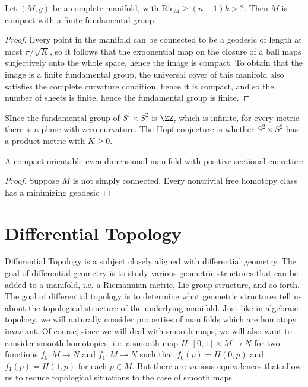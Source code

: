 \begin{corollary}
    Let $(M,g)$ be a complete manifold, with $\text{Ric}_M \geq (n-1)k > ?$. Then $M$ is compact with a finite fundamental group.
\end{corollary}
\begin{proof}
    Every point in the manifold can be connected to be a geodesic of length at most $\pi/\sqrt{K}$, so it follows that the exponential map on the closure of a ball maps surjectively onto the whole space, hence the image is compact. To obtain that the image is a finite fundamental group, the universal cover of this manifold also satisfies the complete curvature condition, hence it is compact, and so the number of sheets is finite, hence the fundamental group is finite.
\end{proof}

\begin{example}
    SInce the fundamental group of $S^1 \times S^2$ is $\ZZ$, which is infinite, for every metric there is a plane with zero curvature. The Hopf conjecture is whether $S^2 \times S^2$ has a product metric with $K \geq 0$.
\end{example}

\begin{theorem}[Synge]
    A compact orientable even dimensional manifold with positive sectional curvature
\end{theorem}
\begin{proof}
    Suppose $M$ is not simply connected. Every nontrivial free homotopy class has a minimizing geodesic
\end{proof}










\part{Differential Topology}

Differential Topology is a subject closely aligned with differential geometry. The goal of differential geometry is to study various geometric structures that can be added to a manifold, i.e. a Riemannian metric, Lie group structure, and so forth. The goal of differential topology is to determine what geometric structures tell us about the topological structure of the underlying manifold. Just like in algebraic topology, we will naturally consider properties of manifolds which are homotopy invariant. Of course, since we will deal with smooth maps, we will also want to consider smooth homotopies, i.e. a smooth map $H: [0,1] \times M \to N$ for two functions $f_0: M \to N$ and $f_1: M \to N$ such that $f_0(p) = H(0,p)$ and $f_1(p) = H(1,p)$ for each $p \in M$. But there are various equivalences that allow us to reduce topological situations to the case of smooth maps.


